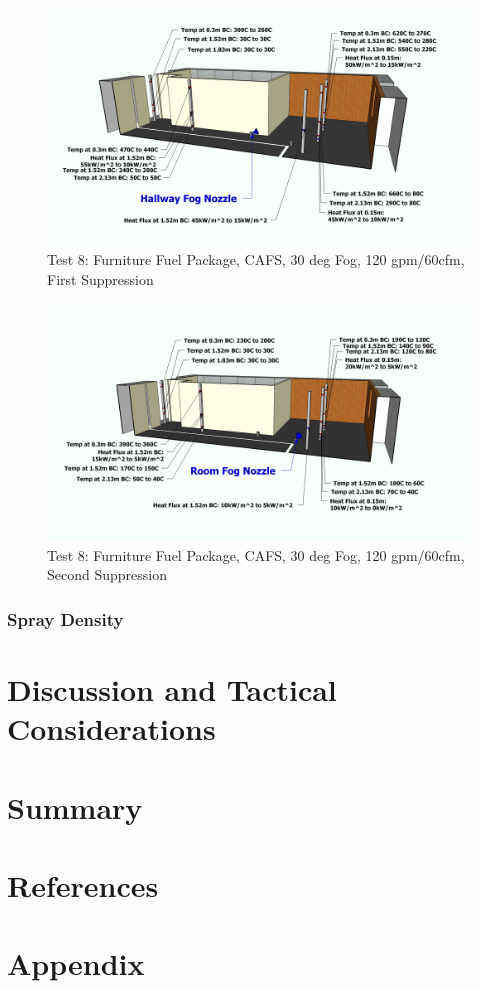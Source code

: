 \documentclass[12pt,oneside]{book}
\begin{document}
\begin{figure}[!ht]
	\includegraphics[width=6in]{../Figures/Pictures/Metric/DelCoFogTest8FirstSuppression}
	\caption{Test 8: Furniture Fuel Package, CAFS, 30 deg Fog, 120 gpm/60cfm, First Suppression}
	\label{fig:Test_8_First_Suppression}
\end{figure}

\begin{figure}[!ht]
	\includegraphics[width=6in]{../Figures/Pictures/Metric/DelCoFogTest8SecondSuppression}
	\caption{Test 8: Furniture Fuel Package, CAFS, 30 deg Fog, 120 gpm/60cfm, Second Suppression}
	\label{fig:Test_8_Second_Suppression}
\end{figure}

\subsection{Spray Density}
\label{subsec:Spray_Density}
	
\chapter{Discussion and Tactical Considerations}
\label{chap:Discussion_and_Tactical_Considerations}

\chapter{Summary}
\label{chap:Summary}

\chapter{References}
\label{chap:References}

\chapter{Appendix}
\label{chap:Appendix}


\clearpage



	
\end{document}
